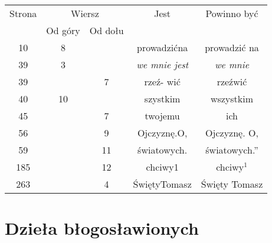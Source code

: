 \documentclass[a4paper,11pt]{article}
\begin{document}
\vspace{0em}





\begin{center}

  \begin{tabular}{|c|c|c|c|c|}
    \hline
    Strona & \multicolumn{2}{c|}{Wiersz} & Jest
                              & Powinno być \\ \cline{2-3}
    & Od góry & Od dołu & & \\
    \hline
    \hphantom{0}10 & \hphantom{0}8 & & prowadzićna & prowadzić na \\
    \hphantom{0}39 & \hphantom{0}3 & & \textit{we mnie jest}
    & \textit{we mnie} \\
    \hphantom{0}39 & & \hphantom{0}7 & rzeź- wić & rzeźwić \\
    \hphantom{0}40 & 10 & & szystkim & wszystkim \\
    \hphantom{0}45 & & \hphantom{0}7 & twojemu & ich \\
    \hphantom{0}56 & & \hphantom{0}9 & Ojczyznę.O, & Ojczyznę. O, \\
    \hphantom{0}59 & & 11 & światowych. & światowych.” \\
    185 & & 12 & chciwy1 & chciwy$^{ 1 }$ \\
    263 & & \hphantom{0}4 & ŚwiętyTomasz & Święty Tomasz \\
    \hline
  \end{tabular}

\end{center}

\vspace{\spaceTwo}












\newpage

\section{Dzieła błogosławionych}
\end{document}
